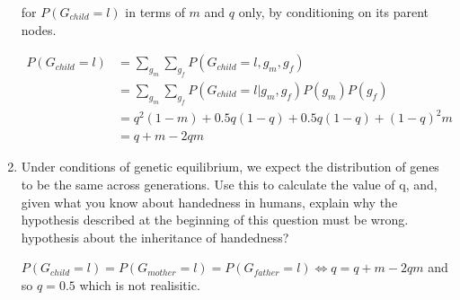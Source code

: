 \documentclass[9pt,a4paper]{extarticle}
\newenvironment{solution}
    {%
    \color{red}
    }
    { 
    \color{black}
    }
\begin{document}
\begin{enumerate}
for $P(G_{child} =l)$ in terms of $m$ and $q$ only, by conditioning on its parent nodes.
\begin{solution}
\begin{align}
    P(G_{child} = l) &= \sum_{g_m}\sum_{g_f} P(G_{child} = l, g_m, g_f)\\
    &=\sum_{g_m}\sum_{g_f} P(G_{child} = l| g_m, g_f)P(g_m)P(g_f)\\
    &= q^2(1-m) + 0.5q(1-q) + 0.5q(1-q) + (1-q)^2m\\
    &= q + m -2qm
\end{align}
\end{solution}
    \item Under conditions of genetic equilibrium, we expect the distribution of genes to be the
same across generations. Use this to calculate the value of q, and, given what you know
about handedness in humans, explain why the hypothesis described at the beginning of
this question must be wrong.
hypothesis about the inheritance of handedness?
\begin{solution}
$P(G_{child} = l) = P(G_{mother} = l) = P(G_{father} = l) \Leftrightarrow q = q + m -2qm $ and so $q=0.5$ which is not realisitic.
\end{solution}
\end{enumerate}
\end{document}
